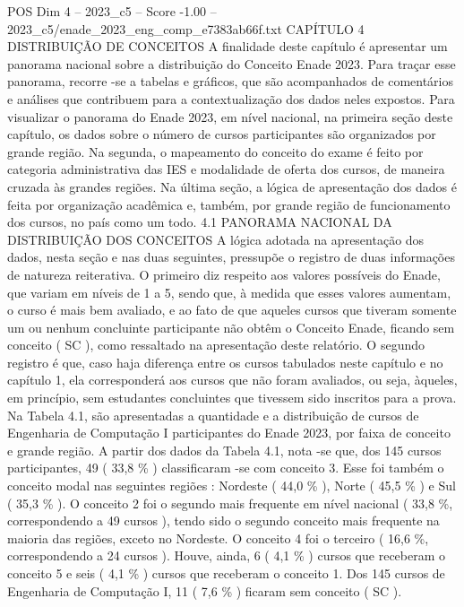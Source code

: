 \begin{textsample}{POS Dim 4 – 2023\_c5 – Score -1.00 – 2023\_c5/enade\_2023\_eng\_comp\_e7383ab66f.txt}  \label{ex:f4_pos_276}
CAPÍTULO 4 DISTRIBUIÇÃO DE CONCEITOS A finalidade deste capítulo é apresentar um panorama nacional sobre a distribuição do Conceito Enade 2023.
Para traçar esse panorama, recorre -se a tabelas e gráficos, que são acompanhados de comentários e análises que contribuem para a contextualização dos dados neles expostos.
Para visualizar o panorama do Enade 2023, em nível nacional, na primeira seção deste capítulo, os dados sobre o número de cursos participantes são organizados por grande região.
Na segunda, o mapeamento do conceito do exame é feito por categoria administrativa das IES e modalidade de oferta dos cursos, de maneira cruzada às grandes regiões.
Na última seção, a lógica de apresentação dos dados é feita por organização acadêmica e, também, por grande região de funcionamento dos cursos, no país como um todo. 4.1 PANORAMA NACIONAL DA DISTRIBUIÇÃO DOS CONCEITOS A lógica adotada na apresentação dos dados, nesta seção e nas duas seguintes, pressupõe o registro de duas informações de natureza reiterativa.
O primeiro diz respeito aos valores possíveis do Enade, que variam em níveis de 1 a 5, sendo que, à medida que esses valores aumentam, o curso é mais bem avaliado, e ao fato de que aqueles cursos que tiveram somente um ou nenhum concluinte participante não obtêm o Conceito Enade, ficando sem conceito ( SC ), como ressaltado na apresentação deste relatório.
O segundo registro é que, caso haja diferença entre os cursos tabulados neste capítulo e no capítulo 1, ela corresponderá aos cursos que não foram avaliados, ou seja, àqueles, em princípio, sem estudantes concluintes que tivessem sido inscritos para a prova.
Na Tabela 4.1, são apresentadas a quantidade e a distribuição de cursos de Engenharia de Computação I participantes do Enade 2023, por faixa de conceito e grande região.
A partir dos dados da Tabela 4.1, nota -se que, dos 145 cursos participantes, 49 ( 33,8 \% ) classificaram -se com conceito 3.
Esse foi também o conceito modal nas seguintes regiões : Nordeste ( 44,0 \% ), Norte ( 45,5 \% ) e Sul ( 35,3 \% ).
O conceito 2 foi o segundo mais frequente em nível nacional ( 33,8 \%, correspondendo a 49 cursos ), tendo sido o segundo conceito mais frequente na maioria das regiões, exceto no Nordeste.
O conceito 4 foi o terceiro ( 16,6 \%, correspondendo a 24 cursos ).
Houve, ainda, 6 ( 4,1 \% ) cursos que receberam o conceito 5 e seis ( 4,1 \% ) cursos que receberam o conceito 1.
Dos 145 cursos de Engenharia de Computação I, 11 ( 7,6 \% ) ficaram sem conceito ( SC ).

\end{textsample}
